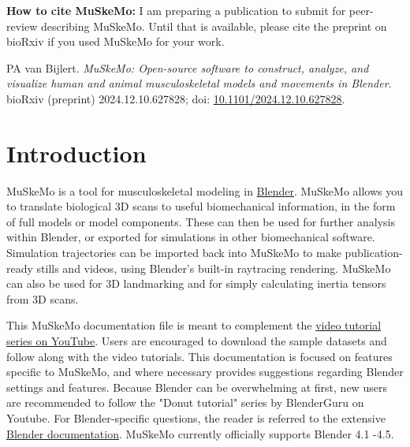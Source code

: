 \documentclass{article}
\begin{document}
\vspace{20pt} %
\noindent
\textbf{How to cite MuSkeMo:} I am preparing a publication to submit for peer-review describing MuSkeMo. Until that is available, please cite the preprint on bioRxiv if you used MuSkeMo for your work.

\noindent
PA van Bijlert. \textit{MuSkeMo: Open-source software to construct, analyze, and visualize human and animal musculoskeletal models and movements in Blender}. bioRxiv (preprint) 2024.12.10.627828; doi: \href{https://doi.org/10.1101/2024.12.10.627828}{10.1101/2024.12.10.627828}.

\vfill  %

\newpage  %


\tableofcontents

\newpage
\section{Introduction}

MuSkeMo is a tool for musculoskeletal modeling in \href{https://www.blender.org}{Blender}. MuSkeMo allows you to translate biological 3D scans to useful biomechanical information, in the form of full models or model components. These can then be used for further analysis within Blender, or exported for simulations in other biomechanical software. Simulation trajectories can be imported back into MuSkeMo to make publication-ready stills and videos, using Blender's built-in raytracing rendering. MuSkeMo can also be used for 3D landmarking and for simply calculating inertia tensors from 3D scans.

This MuSkeMo documentation file is meant to complement the \href{https://youtube.com/playlist?list=PLfgxaucAWlEp5-cavvXmdrTIWYT_tgZYK&si=Cdl9MchuLP5aRJNL}{video tutorial series on YouTube}. Users are encouraged to download the sample datasets and follow along with the video tutorials.
This documentation is focused on features specific to MuSkeMo, and where necessary provides suggestions regarding Blender settings and features. Because Blender can be overwhelming at first, new users are recommended to follow the "Donut tutorial" series by BlenderGuru on Youtube. For Blender-specific questions, the reader is referred to the extensive \href{https://docs.blender.org/}{Blender documentation}. MuSkeMo currently officially supports Blender 4.1 -4.5.
\end{document}
